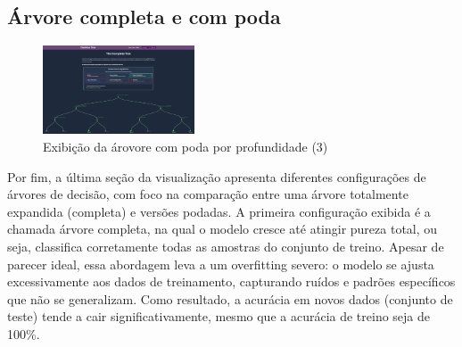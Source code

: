 \documentclass[conference]{IEEEtran}
\begin{document}
\subsection{Árvore completa e com poda}

\begin{figure}[h]
    \centering
    \includegraphics[width=0.4\textwidth]{treePrun.png}
    \caption{Exibição da árovore com poda por profundidade (3)}
    \label{fig:minha_imagem}
\end{figure}

Por fim, a última seção da visualização apresenta diferentes configurações de árvores de decisão, com foco na comparação entre uma árvore totalmente expandida (completa) e versões podadas. A primeira configuração exibida é a chamada árvore completa, na qual o modelo cresce até atingir pureza total, ou seja, classifica corretamente todas as amostras do conjunto de treino. Apesar de parecer ideal, essa abordagem leva a um overfitting severo: o modelo se ajusta excessivamente aos dados de treinamento, capturando ruídos e padrões específicos que não se generalizam. Como resultado, a acurácia em novos dados (conjunto de teste) tende a cair significativamente, mesmo que a acurácia de treino seja de 100\%.
\end{document}
